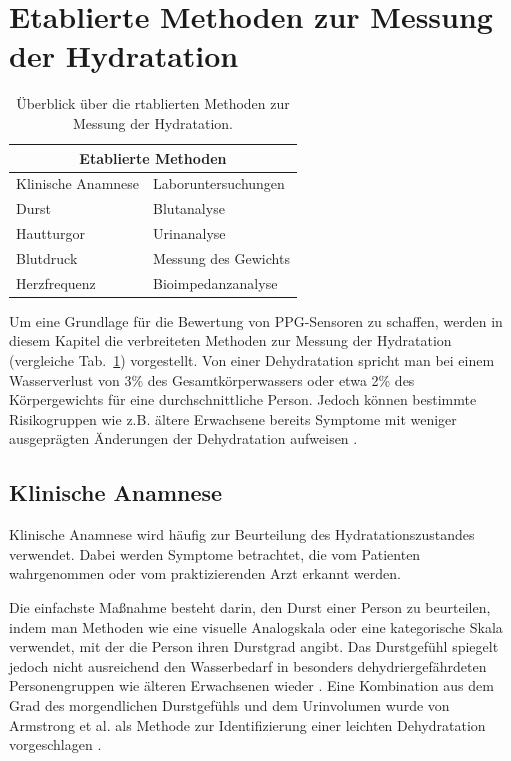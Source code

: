 \documentclass[10pt,a4paper,headinclude,twoside, plainheadsepline, open=right, numbers=noenddot, twocolumn]{article}
\begin{document}
\section{Etablierte Methoden zur Messung der Hydratation}
\label{methoden zur messung der hydratation}

\begin{table}[ht]
\centering
\begin{tabular*}{10cm}{p{4.5cm}p{4.5cm}}
\toprule
\multicolumn{2}{c}{\textbf{Etablierte Methoden}} \\
 \midrule
Klinische Anamnese & Laboruntersuchungen  \\
\cmidrule(r){1-1}\cmidrule(l){2-2}
Durst & Blutanalyse \\
Hautturgor & Urinanalyse  \\
Blutdruck & Messung des Gewichts  \\
Herzfrequenz & Bioimpedanzanalyse  \\
\bottomrule
\end{tabular*}
\caption{Überblick über die rtablierten Methoden zur Messung der Hydratation.}
\label{methodenübersicht}
\end{table}


Um eine Grundlage für die Bewertung von PPG-Sensoren zu schaffen, werden in diesem Kapitel die verbreiteten Methoden zur Messung der Hydratation (vergleiche Tab.~\ref{methodenübersicht}) vorgestellt.
Von einer Dehydratation spricht man bei einem Wasserverlust von 3\% des Gesamtkörperwassers oder etwa 2\% des Körpergewichts für eine durchschnittliche Person.
Jedoch können bestimmte Risikogruppen wie z.B. ältere Erwachsene bereits Symptome mit weniger ausgeprägten Änderungen der Dehydratation aufweisen \cite{garret2018engineering}.

\subsection{Klinische Anamnese}
\label{klinische anamnese}

Klinische Anamnese wird häufig zur Beurteilung des Hydratationszustandes verwendet.
Dabei werden Symptome betrachtet, die vom Patienten wahrgenommen oder vom praktizierenden Arzt erkannt werden.

Die einfachste Maßnahme besteht darin, den Durst einer Person zu beurteilen, indem man Methoden wie eine visuelle Analogskala oder eine kategorische Skala verwendet, mit der die Person ihren Durstgrad angibt.
Das Durstgefühl spiegelt jedoch nicht ausreichend den Wasserbedarf in besonders dehydriergefährdeten Personengruppen wie älteren Erwachsenen wieder \cite{garret2018engineering}.
Eine Kombination aus dem Grad des morgendlichen Durstgefühls und dem Urinvolumen wurde von Armstrong et al. als Methode zur Identifizierung einer leichten Dehydratation vorgeschlagen \cite{armstrong2013novel}.
\end{document}
